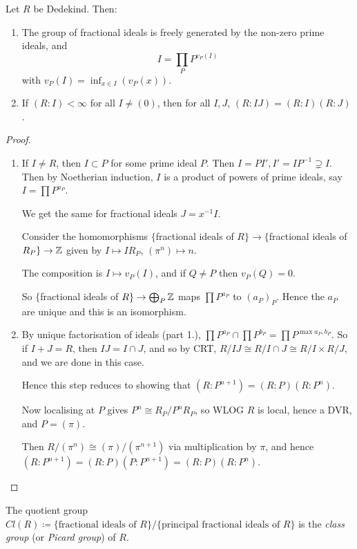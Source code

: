 \documentclass[10pt,a4paper]{article}
\begin{document}
\begin{theorem}
  Let $R$ be Dedekind. Then:
  \begin{enumerate}
    \item The group of fractional ideals is freely generated by the non-zero prime ideals, and
    \[I = \prod_P P^{v_P(I)}\]
    with $v_P(I) = \inf_{x\in I}(v_P(x))$.
    \item If $(R:I) < \infty$ for all $I \neq (0)$, then for all $I, J$, $(R: IJ) = (R:I)(R:J)$.
  \end{enumerate}
\end{theorem}
\begin{proof}\hspace*{0cm}
  \begin{enumerate}
    \item If $I \neq R$, then $I \subset P$ for some prime ideal $P$. Then $I = PI', I' = IP^{-1} \supsetneq I$. Then by Noetherian induction, $I$ is a product of powers of prime ideals, say $I = \prod P^{a_P}$.

    We get the same for fractional ideals $J = x^{-1} I$.

    Consider the homomorphisms $\{$fractional ideals of $R\}\to\{$fractional ideals of $R_P\}\to\mathbb{Z}$ given by $I \mapsto IR_P$, $(\pi^n)\mapsto n$.

    The composition is $I \mapsto v_P(I)$, and if $Q \neq P$ then $v_P(Q) = 0$.

    So $\{$fractional ideals of $R\}\to \bigoplus_P \mathbb{Z}$ maps $\prod P^{a_P}$ to $(a_P)_P$. Hence the $a_P$ are unique and this is an isomorphism.
    \item By unique factorisation of ideals (part 1.), $\prod P^{a_P} \cap \prod P^{b_P} = \prod P^{\max{a_P,b_P}}$. So if $I+J=R$, then $IJ = I \cap J$, and so by CRT, $R/IJ \cong R/I\cap J \cong R/I \times R/J$, and we are done in this case.

    Hence this step reduces to showing that $(R:P^{n+1}) = (R:P)(R:P^n)$.

    Now localising at $P$ gives $P^n \cong R_P/P^nR_P$, so WLOG $R$ is local, hence a DVR, and $P = (\pi)$.

    Then $R/(\pi^n)\cong (\pi)/(\pi^{n+1})$ via multiplication by $\pi$, and hence $(R:P^{n+1}) = (R:P)(P:P^{n+1}) = (R:P)(R:P^n)$.
  \end{enumerate}
\end{proof}
The quotient group $Cl(R) \coloneqq \{\text{fractional ideals of $R$}\}/\{\text{principal fractional ideals of $R$}\}$ is the \emph{class group} (or \emph{Picard group}) of $R$.
\end{document}
